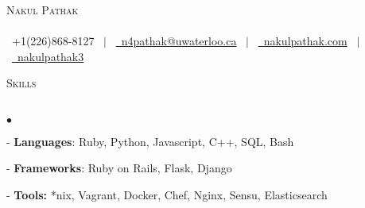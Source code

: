 \documentclass[11pt]{article}
\newcommand{\lineunder}{\vspace*{-8pt} \\ \hspace*{-18pt} \hrulefill \\}
\newcommand{\header}[1]{{\hspace*{-15pt}\vspace*{6pt} \textsc{#1}} \vspace*{-6pt} \lineunder }
\newenvironment{achievements}{\begin{list}{$\bullet$}{\topsep 0pt \itemsep -1.5pt \leftmargin 5pt}}{\vspace*{4pt}\end{list}}
\begin{document}
\small
\smallskip
\vspace*{-45pt}

\begin{center}
  {\Huge \scshape {Nakul Pathak}} \\
\hspace*{-18pt} \hrulefill \\
\vspace{1pt}
\hspace*{-13pt} \faPhone \  +1(226)868-8127 \ $|$ \  \href{mailto:n4pathak@uwaterloo.ca}{\faEnvelope \ n4pathak@uwaterloo.ca} \  $|$ \  \href{http://nakulpathak.com}{\faGlobe \ nakulpathak.com}  \ $|$ \   \href{https://github.com/nakulpathak3}{\faGithub \ nakulpathak3}
\vspace{-5pt}
\end{center}

\vspace{4pt}

\header{\fontsize{11.4}{10}\selectfont Skills}
\begin{achievements}
\item[-] \textbf{Languages}: Ruby, Python, Javascript, C++, SQL, Bash
\vspace{2pt}
\item[-] \textbf{Frameworks}: Ruby on Rails, Flask, Django
\vspace{2pt}
\item[-] \textbf{Tools:} *nix, Vagrant, Docker, Chef, Nginx, Sensu, Elasticsearch
\end{achievements}

\vspace{6pt}
\end{document}
